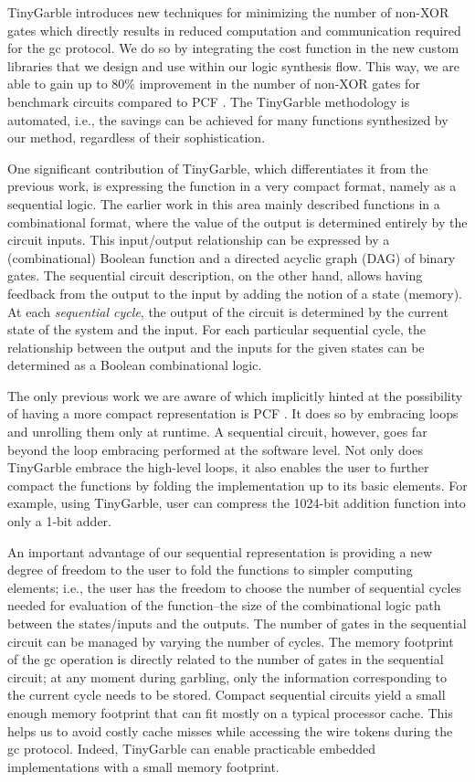 TinyGarble introduces new techniques for minimizing the number of non-XOR gates which directly results in reduced computation and communication required for the \acrshort{gc} protocol.
We do so by integrating the cost function in the new custom libraries that we design and use within our logic synthesis flow.
This way, we are able to gain up to $80\%$ improvement in the number of non-XOR gates for benchmark circuits compared to PCF \cite{kreuter2013pcf}.
The TinyGarble methodology is automated, i.e., the savings can be achieved for many functions synthesized by our method, regardless of their sophistication.

One significant contribution of TinyGarble, which differentiates it from the previous work, is expressing the function in a very compact format, namely as a sequential logic.
The earlier work in this area mainly described functions in a combinational format, where the value of the output is determined entirely by the circuit inputs.
This input/output relationship can be expressed by a (combinational) Boolean function and a directed acyclic graph (DAG) of binary gates.
The sequential circuit description, on the other hand, allows having feedback from the output to the input by adding the notion of a state (memory).
At each \emph{sequential cycle}, the output of the circuit is determined by the current state of the system and the input.
For each particular sequential cycle, the relationship between the output and the inputs for the given states can be determined as a Boolean combinational logic.

The only previous work we are aware of which implicitly hinted at the possibility of having a more compact representation is PCF \cite{kreuter2013pcf}.
It does so by embracing loops and unrolling them only at runtime.
A sequential circuit, however, goes far beyond the loop embracing performed at the software level.
Not only does TinyGarble embrace the high-level loops, it also enables the user to further compact the functions by folding the implementation up to its basic elements.
For example, using TinyGarble, user can compress the 1024-bit addition function into only a 1-bit adder.

An important advantage of our sequential representation is providing a new degree of freedom to the user to fold the functions to simpler computing elements; i.e., the user has the freedom to choose the number of sequential cycles needed for evaluation of the function--the size of the combinational logic path between the states/inputs and the outputs.
The number of gates in the sequential circuit can be managed by varying the number of cycles.
The memory footprint of the \acrshort{gc} operation is directly related to the number of gates in the sequential circuit; at any moment during garbling, only the information corresponding to the current cycle needs to be stored.
Compact sequential circuits yield a small enough memory footprint that can fit mostly on a typical processor cache.
This helps us to avoid costly cache misses while accessing the wire tokens during the \acrshort{gc} protocol.
Indeed, TinyGarble can enable practicable embedded implementations with a small memory footprint.

